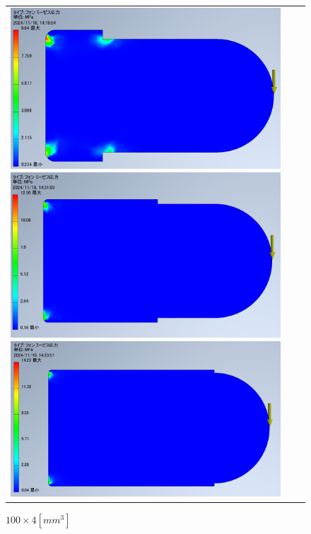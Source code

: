   \begin{figure}[H]
    \begin{tabular}{ccc}
      \begin{minipage}{.25\textwidth}
        \centering
        \includegraphics[width=0.99\linewidth]{images/4-3_voms.png}
        \caption{$50\times8[mm^3]$}
        \label{img:4-3_voms}
      \end{minipage}
      \begin{minipage}{.25\textwidth}
        \centering
        \includegraphics[width=0.99\linewidth]{images/4-6_voms.png}
        \caption{$100\times4[mm^3]$}
        \label{img:4-7_voms}
      \end{minipage}
      \begin{minipage}{.25\textwidth}
        \centering
        \includegraphics[width=0.99\linewidth]{images/4-7_voms.png}

\end{minipage}
\end{tabular}
\end{figure}
